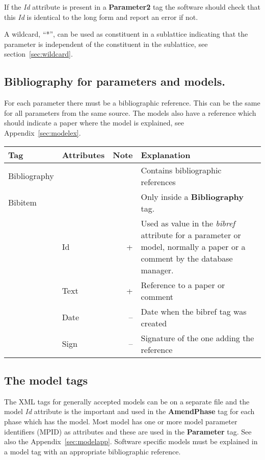 \documentclass{article}
\begin{document}
If the {\em Id} attribute is present in a {\bf Parameter2} tag the
software should check that this {\em Id} is identical to the long form
and report an error if not.

A wildcard, ``*'', can be used as constituent in a sublattice
indicating that the parameter is independent of the constituent in
the sublattice, see section~\ref{sec:wildcard}.

\newpage 

\subsection{Bibliography for parameters and models.}\label{sec:biblio}

For each parameter there must be a bibliographic reference.  This can
be the same for all parameters from the same source.  The models also
have a reference which should indicate a paper where the model is
explained, see Appendix~\ref{sec:modelex}.

\bigskip
\begin{tabular}{|p{} p{} r p{}|}\hline
  Tag & Attributes & Note & Explanation\\\hline

  Bibliography & && Contains bibliographic references\\\hline

  Bibitem & && Only inside a {\bf Bibliography} tag.\\
      & Id & + &   Used as value in the {\em bibref} attribute for a parameter
            or model, normally a paper or a comment by the database manager.\\
      & Text & + & Reference to a paper or comment\\
      & Date & -- & Date when the bibref tag was created\\
      & Sign & -- & Signature of the one adding the reference\\\hline

\end{tabular}

\newpage 

\subsection{The model tags}\label{sec:models}

The XML tags for generally accepted models can be on a separate file
and the model {\em Id} attribute is the important and used in the {\bf
  AmendPhase} tag for each phase which has the model.  Most model has
one or more model parameter identifiers (MPID) as attributes and these
are used in the {\bf Parameter} tag.  See also the
Appendix~\ref{sec:modelapp}.  Software specific models must be
explained in a model tag with an appropriate bibliographic reference.
\end{document}
